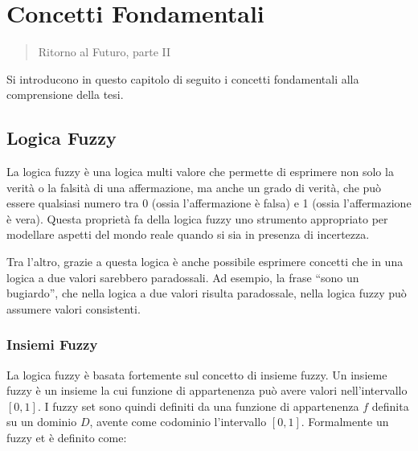 \chapter{Concetti Fondamentali}
\label{cap:concetti}
\thispagestyle{empty}


\begin{quotation}
{\footnotesize
{}
\begin{flushright}
Ritorno al Futuro, parte II
\end{flushright}
}
\end{quotation}
\vspace{0.5cm}

Si introducono in questo capitolo di seguito i concetti fondamentali alla comprensione della tesi.

\section{Logica Fuzzy}
La logica fuzzy è una logica multi valore che permette di esprimere non solo la verità o la falsità di una affermazione, ma anche un grado di verità, che può essere qualsiasi numero tra 0 (ossia l'affermazione è falsa) e 1 (ossia l'affermazione è vera). Questa propriet\`a fa della logica fuzzy uno strumento appropriato per modellare aspetti del mondo reale quando si sia in presenza di incertezza.

Tra l'altro, grazie a questa logica è anche possibile esprimere concetti che in una logica a due valori sarebbero paradossali.
Ad esempio, la frase ``sono un bugiardo'', che nella logica a due valori risulta paradossale, nella logica fuzzy può assumere valori consistenti.

\subsection{Insiemi Fuzzy}
La logica fuzzy è basata fortemente sul concetto di insieme fuzzy. Un insieme fuzzy è un insieme la cui funzione di appartenenza può avere valori nell'intervallo $[0, 1]$.
I fuzzy set sono quindi definiti da una funzione di appartenenza $f$ definita su un dominio $D$, avente come codominio l'intervallo $[0,  1]$.  Formalmente un fuzzy et è definito come:

